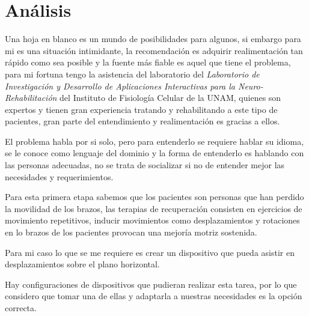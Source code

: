 \chapter{Análisis}

Una hoja en blanco es un mundo de posibilidades para algunos, si embargo para mi
es una situación intimidante, la recomendación es adquirir realimentación tan 
rápido como sea posible y la fuente más fiable es aquel que tiene el problema, 
para mi fortuna tengo la asistencia del laboratorio del \emph{Laboratorio de 
Investigación y Desarrollo de Aplicaciones Interactivas para la
Neuro-Rehabilitación} del Instituto de Fisiología Celular de la UNAM, quienes
son expertos y tienen gran experiencia tratando y rehabilitando a este tipo 
de pacientes, gran parte del entendimiento y realimentación es gracias a ellos.

El problema habla por si solo, pero para entenderlo se requiere hablar su idioma,
se le conoce como lenguaje del dominio y la forma de entenderlo es hablando 
con las personas adecuadas, no se trata de socializar si no de entender mejor 
las necesidades y requerimientos.

Para esta primera etapa sabemos que los pacientes son personas que han perdido 
la movilidad de los brazos, las terapias de recuperación consisten en ejercicios
de movimiento repetitivos, inducir movimientos como desplazamientos  y rotaciones
en lo brazos de los pacientes provocan una mejoría motriz sostenida.   

Para mi caso lo que se me requiere es crear un dispositivo que pueda asistir en
desplazamientos sobre el plano horizontal.

Hay configuraciones de dispositivos que pudieran realizar esta tarea, por lo que
considero que tomar una de ellas y adaptarla a nuestras necesidades es la opción
correcta. 

